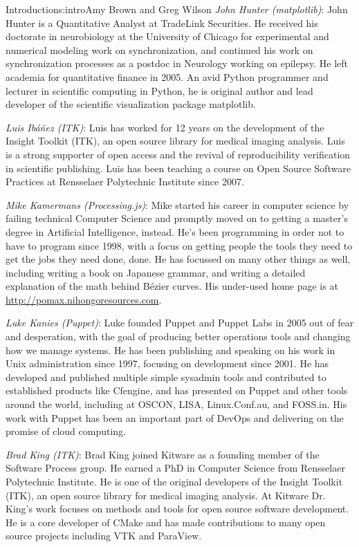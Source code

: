 \begin{aosachapter}{Introduction}{s:intro}{Amy Brown and Greg Wilson}
\emph{John Hunter (matplotlib)}: John Hunter is a Quantitative Analyst
at TradeLink Securities.  He received his doctorate in neurobiology at
the University of Chicago for experimental and numerical modeling work
on synchronization, and continued his work on synchronization
processes as a postdoc in Neurology working on epilepsy. He left
academia for quantitative finance in 2005.  An avid Python programmer
and lecturer in scientific computing in Python, he is original author
and lead developer of the scientific visualization package matplotlib.

\emph{Luis Ib\'{a}\~{n}ez (ITK)}: Luis has worked for 12 years on the development of
the Insight Toolkit (ITK), an open source library for medical imaging analysis.
Luis is a strong supporter of open access and the revival of reproducibility
verification in scientific publishing. Luis has been teaching a course on Open
Source Software Practices at Rensselaer Polytechnic Institute since 2007.

\emph{Mike Kamermans (Processing.js)}: Mike started his career in computer
science by failing technical Computer Science and promptly moved on to
getting a master's degree in Artificial Intelligence, instead. He's been
programming in order not to have to program since 1998, with a focus on
getting people the tools they need to get the jobs they need done, done. 
He has focussed on many other things as well, including writing a book
on Japanese grammar, and writing a detailed explanation of the math behind
B\'{e}zier curves.  His under-used home page is at
\url{http://pomax.nihongoresources.com}.

\emph{Luke Kanies (Puppet)}: Luke founded Puppet and Puppet Labs in 2005 out of
fear and desperation, with the goal of producing better operations tools and
changing how we manage systems. He has been publishing and speaking on his
work in Unix administration since 1997, focusing on development since 2001.  He
has developed and published multiple simple sysadmin tools and contributed to
established products like Cfengine, and has presented on Puppet and other tools
around the world, including at OSCON, LISA, Linux.Conf.au, and FOSS.in.  His
work with Puppet has been an important part of DevOps and delivering on the
promise of cloud computing.

\emph{Brad King (ITK)}:
Brad King joined Kitware as a founding member of the Software Process group.
He earned a PhD in Computer Science from Rensselaer Polytechnic Institute. He
is one of the original developers of the Insight Toolkit (ITK), an open source
library for medical imaging analysis.  At Kitware Dr. King's work focuses on
methods and tools for open source software development. He is a core developer
of CMake and has made contributions to many open source projects including VTK
and ParaView.


\end{aosachapter}
